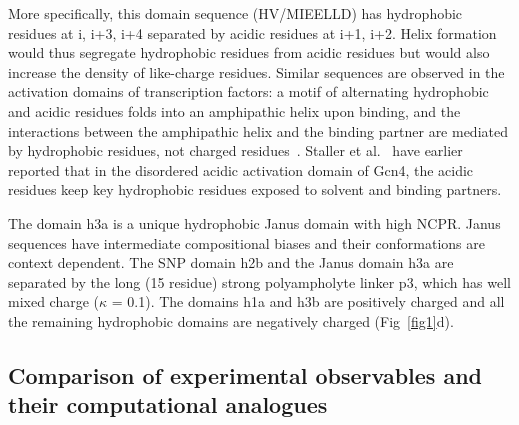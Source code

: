 \documentclass[10pt,letterpaper]{article}
\begin{document}
More specifically, this domain sequence (HV/MIEELLD) has hydrophobic residues at i, i+3, i+4 separated by acidic residues at i+1, i+2. Helix formation would thus segregate hydrophobic residues from acidic residues but would also increase the density of like-charge residues. Similar sequences are observed in the activation domains of transcription factors: a motif of alternating hydrophobic and acidic residues folds into an amphipathic helix upon binding, and the interactions between the amphipathic helix and the binding partner are mediated by hydrophobic residues, not charged residues~\cite{Brzovic2011,Uesugi1997, Radhakrishnan1997, Canales2017, Staller2018}. Staller et al.~\cite{Staller2018} have earlier reported that in the disordered acidic activation domain of Gcn4, the acidic residues keep key hydrophobic residues exposed to solvent and binding partners.

The domain h3a is a unique hydrophobic Janus domain with high NCPR. Janus sequences have intermediate compositional biases and their conformations are context dependent\cite{Das2013a, Das2015b}. The SNP domain h2b and the Janus domain h3a are separated by the long (15 residue) strong polyampholyte linker p3, which has well mixed charge ($\kappa$ = 0.1). The domains h1a and h3b are positively charged and all the remaining hydrophobic domains are negatively charged (Fig~\ref{fig1}d).


\subsection{Comparison of experimental observables and their computational analogues}
\end{document}
